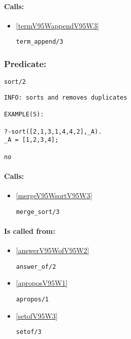 \paragraph{Calls:} 
\begin{itemize}
\item \ref{termV95WappendV95W3} 
\begin{verbatim}
term_append/3
\end{verbatim}

\end{itemize}

\subsubsection{Predicate:} \label{sortV95W2}

\begin{verbatim}
sort/2
\end{verbatim}

{\small \begin{verbatim}
INFO: sorts and removes duplicates

EXAMPLE(S):

?-sort([2,1,3,1,4,4,2],_A).
_A = [1,2,3,4];

no

\end{verbatim}}
\paragraph{Calls:} 
\begin{itemize}
\item \ref{mergeV95WsortV95W3} 
\begin{verbatim}
merge_sort/3
\end{verbatim}

\end{itemize}
\paragraph{Is called from:} 
\begin{itemize}
\item \ref{answerV95WofV95W2} 
\begin{verbatim}
answer_of/2
\end{verbatim}

\item \ref{aproposV95W1} 
\begin{verbatim}
apropos/1
\end{verbatim}

\item \ref{setofV95W3} 
\begin{verbatim}
setof/3
\end{verbatim}

\end{itemize}

